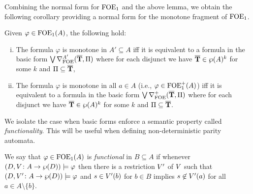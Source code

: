 Combining the normal form for $\ofoe$ and the above lemma, we obtain the following corollary providing a normal form for the monotone fragment of $\ofoe$.

\begin{corollary}\label{cor:ofoepositivenf}
	Given $\varphi \in \ofoe(A)$, the following hold:
	\begin{enumerate}[(i)]
		\item The formula $\varphi$ is monotone in $A'\subseteq A$ iff it is equivalent to a formula in the basic form $\bigvee \mondbnfofoe{\vlist{T}}{\Pi}{A'}$
		where
		for each disjunct we have $\vlist{T} \in \wp(A)^k$ for some $k$ and $\Pi\subseteq\vlist{T}$,
		\item The formula $\varphi$ is monotone in all $a\in A$ (i.e., $\varphi\in \ofoe^+(A)$) iff it is equivalent to a formula in the basic form $\bigvee \posdbnfofoe{\vlist{T}}{\Pi}$
		where
		for each disjunct we have $\vlist{T} \in \wp(A)^k$ for some $k$ and $\Pi\subseteq\vlist{T}$.
	\end{enumerate}
\end{corollary}

We isolate the case when basic forms enforce a semantic property called \emph{functionality}. This will be useful when defining non-deterministic parity automata.

\begin{definition}\label{def:functionalsentenceofoe}
We say that $\varphi \in \ofoe(A)$ is \emph{functional} in $B\subseteq A$ if whenever $(D,\val \: A \to \wp(D)) \models \varphi$ then there is a restriction $\val'$ of $\val$ such that $(D,\val' \: A \to \wp(D)) \models \varphi$ and $s \in \val'(b)$ for $b \in B$ implies $s \not\in \val'(a)$ for all $a \in A\setminus\{b\}$.
\end{definition}

